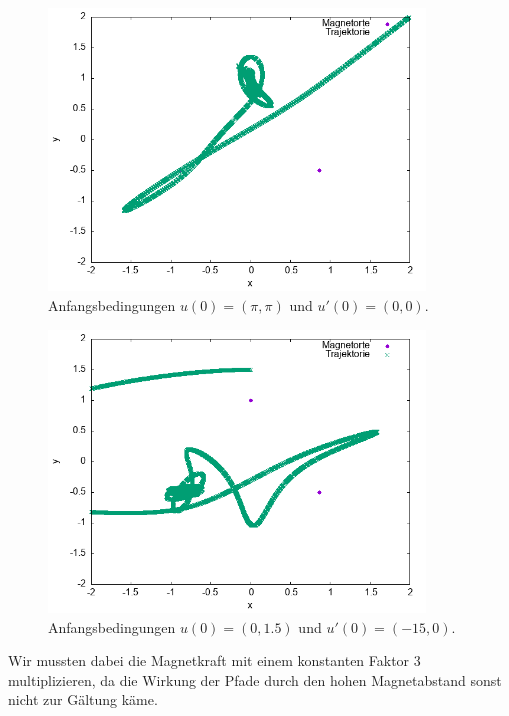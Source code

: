 \documentclass[
    oneside,
    ngerman,
    footinclude=false,
    captions=tableheading,
    DIV=12
]{scrartcl}
\begin{document}
    \begin{figure}[H]
        \centering
        \includegraphics[width=10cm]{../Simulation/img/trcs/velverl3-314-314-0-0.png}
        \caption{Anfangsbedingungen $u(0) = (\pi,\pi)$ und $u'(0) = (0,0)$.}
    \end{figure}

    \begin{figure}[H]
        \centering
        \includegraphics[width=10cm]{../Simulation/img/trcs/velverl3-0-1.5--15-0.png}
        \caption{Anfangsbedingungen $u(0) = (0,1.5)$ und $u'(0) = (-15,0)$.}
    \end{figure}

    Wir mussten dabei die Magnetkraft mit einem konstanten Faktor $3$ multiplizieren, da die Wirkung der Pfade durch den hohen Magnetabstand sonst nicht zur Gältung käme. 

\subaufgabe{}

\subaufgabe{}
\end{document}
